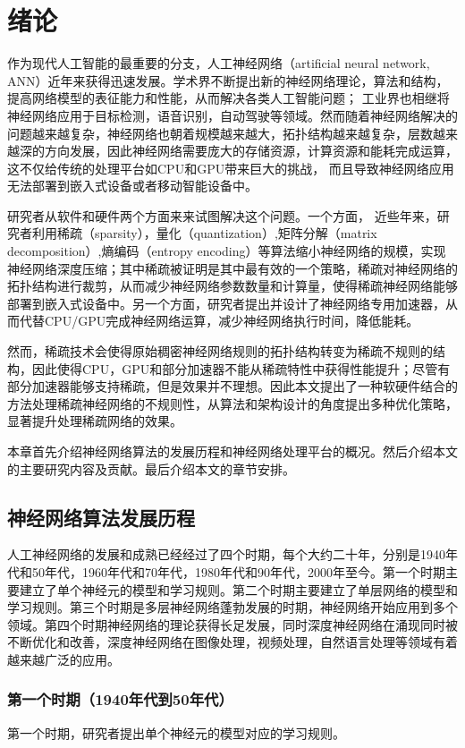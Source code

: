 \chapter{绪论}

作为现代人工智能的最重要的分支，人工神经网络（artificial neural network, ANN）近年来获得迅速发展。学术界不断提出新的神经网络理论，算法和结构，提高网络模型的表征能力和性能，从而解决各类人工智能问题；
工业界也相继将神经网络应用于目标检测，语音识别，自动驾驶等领域。然而随着神经网络解决的问题越来越复杂，神经网络也朝着规模越来越大，拓扑结构越来越复杂，层数越来越深的方向发展，因此神经网络需要庞大的存储资源，计算资源和能耗完成运算，这不仅给传统的处理平台如CPU和GPU带来巨大的挑战， 而且导致神经网络应用无法部署到嵌入式设备或者移动智能设备中。

研究者从软件和硬件两个方面来来试图解决这个问题。一个方面， 近些年来，研究者利用稀疏（sparsity），量化（quantization）,矩阵分解（matrix decomposition）,熵编码（entropy encoding）等算法缩小神经网络的规模，实现神经网络深度压缩；其中稀疏被证明是其中最有效的一个策略，稀疏对神经网络的拓扑结构进行裁剪，从而减少神经网络参数数量和计算量，使得稀疏神经网络能够部署到嵌入式设备中。另一个方面，研究者提出并设计了神经网络专用加速器，从而代替CPU/GPU完成神经网络运算，减少神经网络执行时间，降低能耗。

然而，稀疏技术会使得原始稠密神经网络规则的拓扑结构转变为稀疏不规则的结构，因此使得CPU，GPU和部分加速器不能从稀疏特性中获得性能提升；尽管有部分加速器能够支持稀疏，但是效果并不理想。因此本文提出了一种软硬件结合的方法处理稀疏神经网络的不规则性，从算法和架构设计的角度提出多种优化策略，显著提升处理稀疏网络的效果。

本章首先介绍神经网络算法的发展历程和神经网络处理平台的概况。然后介绍本文的主要研究内容及贡献。最后介绍本文的章节安排。

\section{神经网络算法发展历程}
人工神经网络的发展和成熟已经经过了四个时期，每个大约二十年，分别是1940年代和50年代，1960年代和70年代，1980年代和90年代，2000年至今。第一个时期主要建立了单个神经元的模型和学习规则。第二个时期主要建立了单层网络的模型和学习规则。第三个时期是多层神经网络蓬勃发展的时期，神经网络开始应用到多个领域。第四个时期神经网络的理论获得长足发展，同时深度神经网络在涌现同时被不断优化和改善，深度神经网络在图像处理，视频处理，自然语言处理等领域有着越来越广泛的应用。


\subsection{第一个时期（1940年代到50年代）}
第一个时期，研究者提出单个神经元的模型对应的学习规则。

